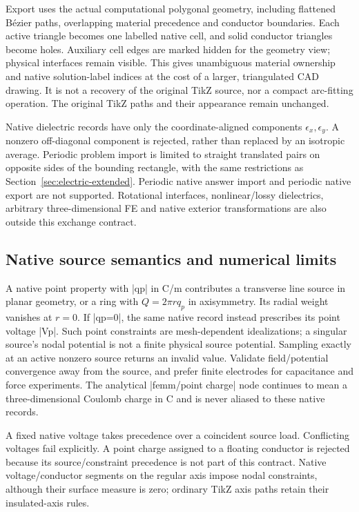 Export uses the actual computational polygonal geometry, including flattened
B\'ezier paths, overlapping material precedence and conductor boundaries. Each
active triangle becomes one labelled native cell, and solid conductor triangles
become holes. Auxiliary cell edges are marked hidden for the geometry view;
physical interfaces remain visible. This gives unambiguous material ownership and native solution-label
indices at the cost of a larger, triangulated CAD drawing. It is not a recovery
of the original TikZ source, nor a compact arc-fitting operation. The original
TikZ paths and their appearance remain unchanged.

Native dielectric records have only the coordinate-aligned components
$\epsilon_x,\epsilon_y$. A nonzero off-diagonal component is rejected, rather
than replaced by an isotropic average. Periodic problem import is limited to
straight translated pairs on opposite sides of the bounding rectangle, with the
same restrictions as Section~\ref{sec:electric-extended}. Periodic native answer
import and periodic native export are not supported. Rotational interfaces,
nonlinear/lossy dielectrics, arbitrary three-dimensional FE and native exterior
transformations are also outside this exchange contract.

\subsection{Native source semantics and numerical limits}
A native point property with |qp| in C/m contributes a transverse line source
in planar geometry, or a ring with $Q=2\pi r q_p$ in axisymmetry. Its radial
weight vanishes at $r=0$. If |qp=0|, the same native record instead prescribes
its point voltage |Vp|. Such point constraints are mesh-dependent idealizations;
a singular source's nodal potential is not a finite physical source potential.
Sampling exactly at an active nonzero source returns an invalid value. Validate
field/potential convergence away from the source, and prefer finite electrodes
for capacitance and force experiments. The analytical |femm/point charge| node
continues to mean a three-dimensional Coulomb charge in C and is never aliased
to these native records.

A fixed native voltage takes precedence over a coincident source load. Conflicting
voltages fail explicitly. A point charge assigned to a floating conductor is
rejected because its source/constraint precedence is not part of this contract.
Native voltage/conductor segments on the regular axis impose nodal constraints,
although their surface measure is zero; ordinary TikZ axis paths retain their
insulated-axis rules.

